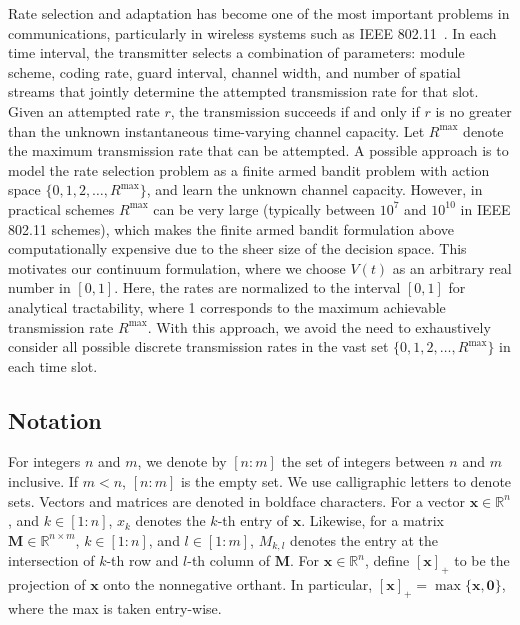 \documentclass[12pt,draftcls, onecolumn]{IEEEtran}
\renewcommand{\vec}[1]{\ensuremath{\boldsymbol{#1}}}
\begin{document}
Rate selection and adaptation has become one of the most important problems in communications, particularly in wireless systems such as IEEE 802.11~\cite{combes_optimal_2013,combes_optimal_2019,tang_joint_2021,cho_use_2023,tong_rate_2023,le_multi-armed_2024}. In each time interval, the transmitter selects a combination of parameters: module scheme, coding rate, guard interval, channel width, and number of spatial streams that jointly determine the attempted transmission rate for that slot. Given an attempted rate $r$, the transmission succeeds if and only if $r$ is no greater than the unknown instantaneous time-varying channel capacity. Let $R^{\text{max}}$ denote the maximum transmission rate that can be attempted. A possible approach is to model the rate selection problem as a finite armed bandit problem with action space $\{0,1,2,\dots,R^{\text{max}}\}$, and learn the unknown channel capacity. However, in practical schemes $R^{\text{max}}$ can be very large (typically between $10^7$ and $10^{10}$ in IEEE 802.11 schemes), which makes the finite armed bandit formulation above computationally expensive due to the sheer size of the decision space. This motivates our continuum formulation, where we choose $V(t)$ as an arbitrary real number in $[0,1]$. Here, the rates are normalized to the interval $[0,1]$ for analytical tractability, where 1 corresponds to the maximum achievable transmission rate $R^{\text{max}}$. With this approach, we avoid the need to exhaustively consider all possible discrete transmission rates in the vast set $\{0,1,2,\dots,R^{\text{max}}\}$ in each time slot.

\subsection{Notation}
For integers $n$ and $m$, we denote by $[n:m]$ the set of integers between $n$ and $m$ inclusive. If $m<n$, $[n:m]$ is the empty set. We use calligraphic letters to denote sets. Vectors and matrices are denoted in boldface characters. For a vector $\vec{x} \in \mathbb{R}^n$, and $k \in [1:n]$, $x_k$ denotes the $k$-th entry of $\vec{x}$. Likewise, for a matrix $\vec{M} \in \mathbb{R}^{ n \times m}$, $k \in [1:n]$, and $l \in [1:m]$, $M_{k,l}$ denotes the entry at the intersection of $k$-th row and $l$-th column of $\vec{M}$. For $\vec{x} \in \mathbb{R}^n$, define $[\vec{x}]_+$ to be the projection of $\vec{x}$ onto the nonnegative orthant. In particular, \([\vec{x}]_+ = \max\{\vec{x},\vec{0}\}\), where the max is taken entry-wise.
\end{document}
